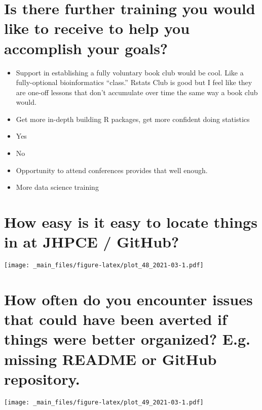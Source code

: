 \documentclass[
]{book}
\providecommand{\tightlist}{%
  \setlength{\itemsep}{0pt}\setlength{\parskip}{0pt}}
\begin{document}
\hypertarget{is-there-further-training-you-would-like-to-receive-to-help-you-accomplish-your-goals-1}{%
\section{Is there further training you would like to receive to help you accomplish your goals?}\label{is-there-further-training-you-would-like-to-receive-to-help-you-accomplish-your-goals-1}}

\begin{itemize}
\tightlist
\item
  Support in establishing a fully voluntary book club would be cool. Like a fully-optional bioinformatics ``class.'' Rstats Club is good but I feel like they are one-off lessons that don't accumulate over time the same way a book club would.
\item
  Get more in-depth building R packages, get more confident doing statistics
\item
  Yes
\item
  No
\item
  Opportunity to attend conferences provides that well enough.
\item
  More data science training
\end{itemize}

\hypertarget{how-easy-is-it-easy-to-locate-things-in-at-jhpce-github-1}{%
\section{How easy is it easy to locate things in at JHPCE / GitHub?}\label{how-easy-is-it-easy-to-locate-things-in-at-jhpce-github-1}}

\texttt{[image: \_main\_files/figure-latex/plot\_48\_2021-03-1.pdf]}

\hypertarget{how-often-do-you-encounter-issues-that-could-have-been-averted-if-things-were-better-organized-e.g.-missing-readme-or-github-repository.-1}{%
\section{How often do you encounter issues that could have been averted if things were better organized? E.g. missing README or GitHub repository.}\label{how-often-do-you-encounter-issues-that-could-have-been-averted-if-things-were-better-organized-e.g.-missing-readme-or-github-repository.-1}}

\texttt{[image: \_main\_files/figure-latex/plot\_49\_2021-03-1.pdf]}
\end{document}
